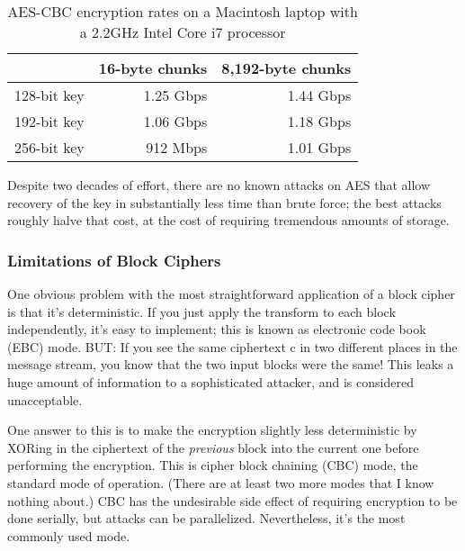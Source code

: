 \documentclass[%
 aip,
 jmp,%
 amsmath,amssymb,
 reprint,%
]{revtex4-1}
\begin{document}

\begin{table}
\begin{tabular}{l | r | r}
            & 16-byte chunks & 8,192-byte chunks \\\hline
128-bit key & 1.25 Gbps & 1.44 Gbps \\
192-bit key & 1.06 Gbps & 1.18 Gbps \\
256-bit key & 912 Mbps & 1.01 Gbps
\end{tabular}
\caption{AES-CBC encryption rates on a Macintosh laptop with a 2.2GHz Intel Core i7 processor}
\label{tab:mac-aes}
\end{table}

Despite two decades of effort, there are no known attacks on AES that allow recovery of the key in substantially less time than brute force; the best attacks roughly halve that cost, at the cost of requiring tremendous amounts of storage.

\subsubsection{Limitations of Block Ciphers}

One obvious problem with the most straightforward application of a
block cipher is that it's deterministic.  If you just apply the
transform to each block independently, it's easy to implement; this is
known as electronic code book (EBC) mode.  BUT: If you see the same
ciphertext c in two different places in the message stream, you know
that the two input blocks were the same!  This leaks a huge amount of
information to a sophisticated attacker, and is considered
unacceptable.

One answer to this is to make the encryption slightly less
deterministic by XORing in the ciphertext of the \emph{previous} block into
the current one before performing the encryption.  This is cipher
block chaining (CBC) mode, the standard mode of operation.  (There are
at least two more modes that I know nothing about.)  CBC has the
undesirable side effect of requiring encryption to be done serially,
but attacks can be parallelized.  Nevertheless, it's the most commonly
used mode.
\end{document}
